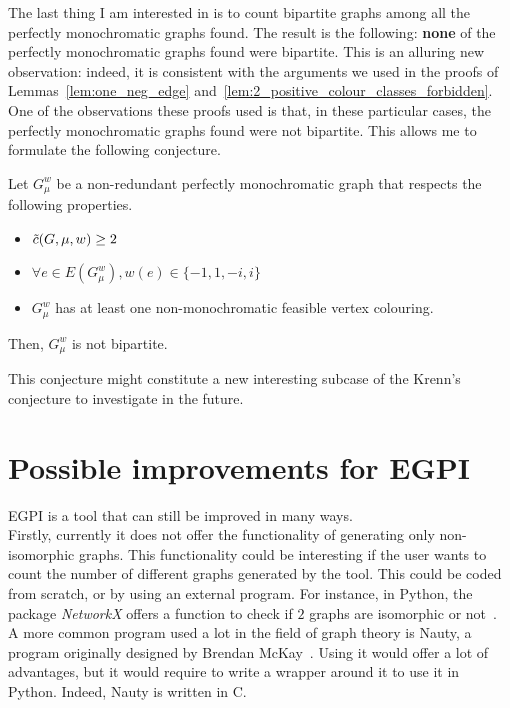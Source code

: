 The last thing I am interested in is to count bipartite graphs among all the perfectly monochromatic graphs found.
The result is the following: \textbf{none} of the perfectly monochromatic graphs found were bipartite.
This is an alluring new observation: indeed, it is consistent with the arguments we used in the proofs of Lemmas~\ref{lem:one_neg_edge} and~\ref{lem:2_positive_colour_classes_forbidden}.
One of the observations these proofs used is that, in these particular cases, the perfectly monochromatic graphs found were not bipartite.
This allows me to formulate the following conjecture.

\begin{conjecture}
    \label{con:bipartite_perfectly_monochromatic}
    Let $G_\mu^w$ be a non-redundant perfectly monochromatic graph that respects the following properties.
    \begin{itemize}
        \item $\Tilde{c}(G, \mu, w) \geq 2$
        \item $\forall e \in E(G_\mu^w), w(e) \in \{-1, 1, -i, i\}$
        \item $G_\mu^w$ has at least one non-monochromatic feasible vertex colouring.
    \end{itemize}
    Then, $G_\mu^w$ is not bipartite.
\end{conjecture}

This conjecture might constitute a new interesting subcase of the Krenn's conjecture to investigate in the future.


\section{Possible improvements for EGPI}
\label{sec:possible-improvements-for-egpi}

EGPI is a tool that can still be improved in many ways.\\

Firstly, currently it does not offer the functionality of generating only non-isomorphic graphs.
This functionality could be interesting if the user wants to count the number of different graphs generated by the tool.
This could be coded from scratch, or by using an external program.
For instance, in Python, the package \textit{NetworkX} offers a function to check if $2$ graphs are isomorphic or not~\cite{networkx}.
A more common program used a lot in the field of graph theory is Nauty, a program originally designed by Brendan McKay~\cite{MCKAY201494}.
Using it would offer a lot of advantages, but it would require to write a wrapper around it to use it in Python.
Indeed, Nauty is written in C. \\

